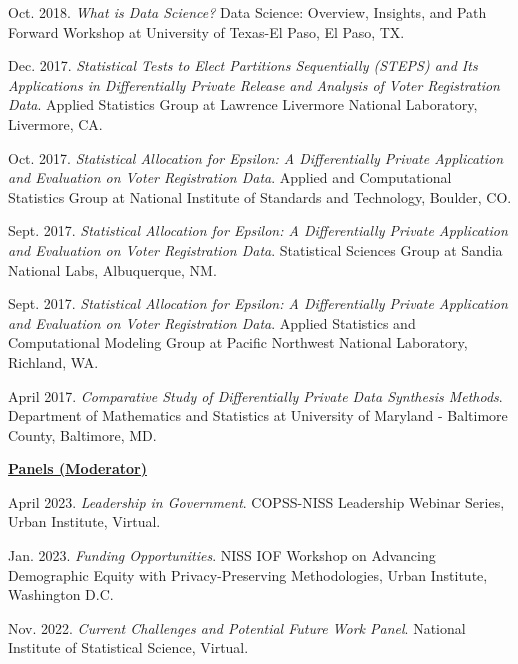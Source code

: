 \begin{etaremune}[topsep=0pt, itemsep=4pt, partopsep=0pt, parsep=0pt]
    \item Oct. 2018. \textit{What is Data Science?} Data Science: Overview, Insights, and Path Forward Workshop at University of Texas-El Paso, El Paso, TX.
    
    \item Dec. 2017. \textit{Statistical Tests to Elect Partitions Sequentially (STEPS) and Its Applications in Differentially Private Release and Analysis of Voter Registration Data}. Applied Statistics Group at Lawrence Livermore National Laboratory, Livermore, CA.
    
    \item Oct. 2017. \textit{Statistical Allocation for Epsilon: A Differentially Private Application and Evaluation on Voter Registration Data}. Applied and Computational Statistics Group at National Institute of Standards and Technology, Boulder, CO.
    
    \item Sept. 2017. \textit{Statistical Allocation for Epsilon: A Differentially Private Application and Evaluation on Voter Registration Data}. Statistical Sciences Group at Sandia National Labs, Albuquerque, NM.
    
    \item Sept. 2017. \textit{Statistical Allocation for Epsilon: A Differentially Private Application and Evaluation on Voter Registration Data}. Applied Statistics and Computational Modeling Group at Pacific Northwest National Laboratory, Richland, WA.
    
    \item April 2017. \textit{Comparative Study of Differentially Private Data Synthesis Methods}. Department of Mathematics and Statistics at University of Maryland - Baltimore County, Baltimore, MD.
    
\vspace{6pt}
\hspace{-0.30in}\underline{\textbf{\large Panels (Moderator)}}\normalsize
    \item April 2023. \textit{Leadership in Government}. COPSS-NISS Leadership Webinar Series, Urban Institute, Virtual.
    
    \item Jan. 2023. \textit{Funding Opportunities}. NISS IOF Workshop on Advancing Demographic Equity with Privacy-Preserving Methodologies, Urban Institute, Washington D.C.
    
    \item Nov. 2022. \textit{Current Challenges and Potential Future Work Panel}. National Institute of Statistical Science, Virtual.
    

\end{etaremune}
